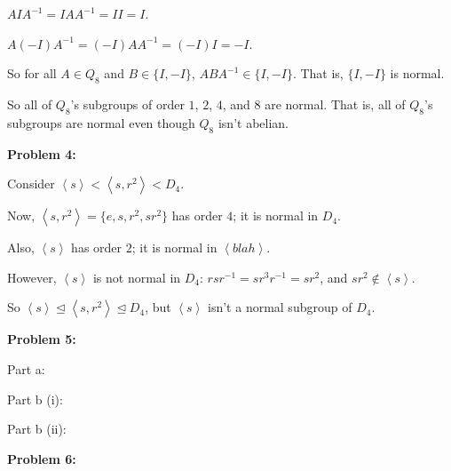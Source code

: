 \documentclass[a4paper,12pt]{article}
\newcommand{\shunt}{\vspace{20mm}}
\newcommand{\anbrack}[1]{\left\langle #1 \right\rangle}
\newcommand{\subgp}{\mathrel{\unlhd}}
\begin{document}
$AIA^{-1} = IAA^{-1} = II=I$.

$A(-I)A^{-1} = (-I)AA^{-1} = (-I)I=-I$.

So for all $A \in Q_8$ and $B \in \{I, -I\}$, $ABA^{-1} \in \{I, -I\}$. That is, $\{I, -I\}$ is normal.

So all of $Q_8$'s subgroups of order $1$, $2$, $4$, and $8$ are normal. That is, all of $Q_8$'s subgroups are normal even though $Q_8$ isn't abelian.

\shunt

{\bf Problem 4:}

Consider $\anbrack{s} < \anbrack{s,r^2} < D_4$.

Now, $\anbrack{s,r^2} = \{e,s,r^2,sr^2\}$ has order $4$; it is normal in $D_4$.

Also, $\anbrack{s}$ has order $2$; it is normal in $\anbrack{blah}$.

However, $\anbrack{s}$ is not normal in $D_4$: $rsr^{-1} = sr^3r^{-1}=sr^2$, and $sr^2 \notin \anbrack{s}$.

So $\anbrack{s} \subgp \anbrack{s,r^2} \subgp D_4$, but $\anbrack{s}$ isn't a normal subgroup of $D_4$.

\shunt

{\bf Problem 5:}

Part a:

\shunt

Part b (i):

\shunt

Part b (ii):

\shunt

{\bf Problem 6:}

\shunt
\end{document}
